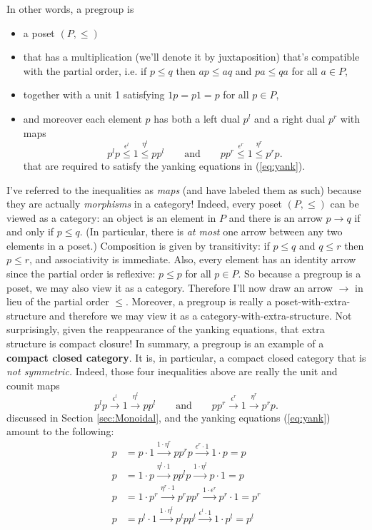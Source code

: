\documentclass{tufte-handout-tai}
\theoremstyle{plain}
\theoremstyle{definition}
\theoremstyle{remark}
\begin{document}
In other words, a pregroup is 
	\begin{itemize}
	\item a poset $(P,\leq)$ 
	\item that has a multiplication (we'll denote it by juxtaposition) that's compatible with the partial order, i.e. if $p\leq q$ then $ap\leq aq$ and $pa\leq qa$ for all $a\in P$,
	\item together with a unit 1 satisfying $1p=p1=p$ for all $p\in P$,
	\item and moreover each element $p$ has both a left dual $p^l$ and a right dual $p^r$ with maps
	\[p^lp\overset{\epsilon^l}{\leq} 1 \overset{\eta^l}{\leq} pp^l 
	\qquad\text{and}\qquad 
	pp^r \overset{\epsilon^r}{\leq} 1 \overset{\eta^r}{\leq} p^rp.\]
that are required to satisfy the yanking equations in (\ref{eq:yank}).
	\end{itemize}
I've referred to the inequalities as \textit{maps} (and have labeled them as such) because they are actually \textit{morphisms} in a category! Indeed, every poset $(P,\leq)$ can be viewed as a category: an object is an element in $P$ and there is an arrow $p\to q$ if and only if $p\leq q.$ (In particular, there is \textit{at most} one arrow between any two elements in a poset.) Composition is given by transitivity: if $p\leq q$ and $q\leq r$ then $p\leq r$, and associativity is immediate. Also, every element has an identity arrow since the partial order is reflexive: $p\leq p$ for all $p\in P$.
So because a pregroup is a poset, we may also view it as a category. Therefore I'll now draw an arrow $\to$ in lieu of the partial order $\leq$. Moreover, a pregroup is really a poset-with-extra-structure and therefore we may view it as a category-with-extra-structure. Not surprisingly, given the reappearance of the yanking equations, that extra structure is compact closure! In summary, a pregroup is an example of a \textbf{compact closed category}. It is, in particular, a compact closed category that is \textit{not symmetric.} Indeed, those four inequalities above are really the unit and counit maps 
	\[p^lp\overset{\epsilon^l}{\longrightarrow} 1 \overset{\eta^l}{\longrightarrow} pp^l 
	\qquad\text{and}\qquad 
	pp^r \overset{\epsilon^r}{\longrightarrow} 1 \overset{\eta^r}{\longrightarrow} p^rp.\]
discussed in Section \ref{sec:Monoidal}, and the yanking equations (\ref{eq:yank}) amount to the following:
	\begin{align*}
	p&=p\cdot1\overset{1\cdot \eta^r}{\longrightarrow} pp^rp \overset{\epsilon^r\cdot 1}{\longrightarrow} 1\cdot p = p\\[10pt]
	p &= 1\cdot p \overset{\eta^l\cdot 1}{\longrightarrow} pp^lp \overset{1\cdot \eta^l}{\longrightarrow} p \cdot 1=p\\[10pt]
	p &= 1\cdot p^r \overset{\eta^r\cdot 1}{\longrightarrow} p^rpp^r\overset{1\cdot \epsilon^r}{\longrightarrow} p^r\cdot 1=p^r\\[10pt]
	p &= p^l\cdot 1 \overset{1 \cdot \eta^l}{\longrightarrow} p^lpp^l \overset{\epsilon^l\cdot 1}{\longrightarrow} 1\cdot p^l=p^l
	\end{align*}
\end{document}
